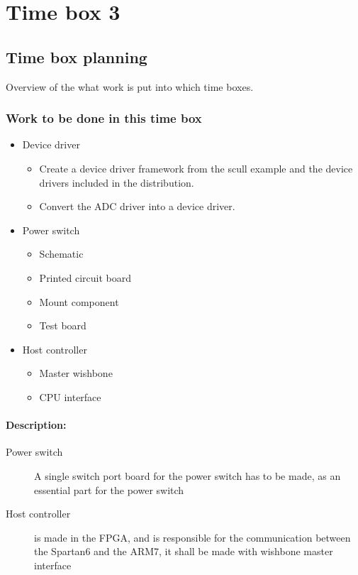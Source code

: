 \section{Time box 3}
\subsection{Time box planning}
Overview of the what work is put into which time boxes.
\begin{figure}[H]
	\begin{centering}
	\end{centering}
\end{figure}

\subsubsection{Work to be done in this time box}
\begin{itemize}
	\item Device driver
	\begin{itemize}
		\item Create a device driver framework from the scull example and the device drivers included in the distribution. 
		\item Convert the ADC driver into a device driver.
	\end{itemize}
	\item Power switch
	\begin{itemize}
		\item Schematic
		\item Printed circuit board
		\item Mount component
		\item Test board
	\end{itemize}
	\item Host controller
	\begin{itemize}
		\item Master wishbone
		\item CPU interface
	\end{itemize}
\end{itemize}
\paragraph{Description:}
\begin{description}
	\item[Power switch] A single switch port board for the power switch has to be made, as an essential part for the power switch
	\item[Host controller] is made in the FPGA, and is responsible for the communication between the Spartan6 and the ARM7, it shall be made with wishbone master interface 
\end{description}

